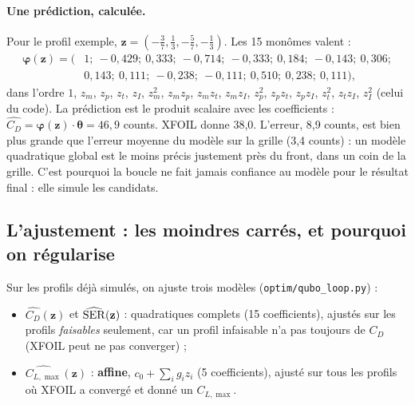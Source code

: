 \paragraph{Une prédiction, calculée.} Pour le profil exemple, $\mathbf z=(-\frac37,\frac13,-\frac57,-\frac13)$. Les 15 monômes valent :
\begin{align*}
\boldsymbol\varphi(\mathbf z)=\big(&1;\ -0{,}429;\ 0{,}333;\ -0{,}714;\ -0{,}333;\ 0{,}184;\ -0{,}143;\ 0{,}306;\\
&0{,}143;\ 0{,}111;\ -0{,}238;\ -0{,}111;\ 0{,}510;\ 0{,}238;\ 0{,}111\big),
\end{align*}
dans l'ordre $1$, $z_m$, $z_p$, $z_t$, $z_I$, $z_m^2$, $z_mz_p$, $z_mz_t$, $z_mz_I$, $z_p^2$, $z_pz_t$, $z_pz_I$, $z_t^2$, $z_tz_I$, $z_I^2$ (celui du code). La prédiction est le produit scalaire avec les coefficients : $\widehat{C_D}=\boldsymbol\varphi(\mathbf z)\cdot\boldsymbol\theta=46{,}9$ counts. XFOIL donne 38,0. L'erreur, 8,9 counts, est bien plus grande que l'erreur moyenne du modèle sur la grille (3,4 counts) : un modèle quadratique global est le moins précis justement près du front, dans un coin de la grille. C'est pourquoi la boucle ne fait jamais confiance au modèle pour le résultat final : elle simule les candidats.

\subsection{L'ajustement : les moindres carrés, et pourquoi on régularise}\label{sec:ridge}
Sur les profils déjà simulés, on ajuste trois modèles (\texttt{optim/qubo\_loop.py}) :
\begin{itemize}
\item $\widehat{C_D}(\mathbf z)$ et $\widehat{\rm SER}(\mathbf z)$ : quadratiques complets (15 coefficients), ajustés sur les profils \emph{faisables} seulement, car un profil infaisable n'a pas toujours de $C_D$ (XFOIL peut ne pas converger) ;
\item $\widehat{C_{L,\max}}(\mathbf z)$ : \textbf{affine}, $c_0+\sum_ig_iz_i$ (5 coefficients), ajusté sur tous les profils où XFOIL a convergé et donné un $C_{L,\max}$.
\end{itemize}


